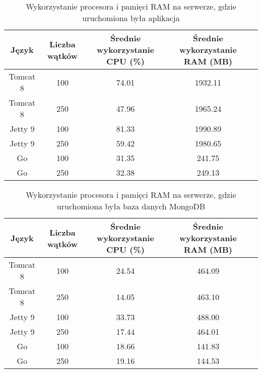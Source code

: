 
\begin{table}[!htb]
\centering
\caption{Wykorzystanie procesora i pamięci RAM na serwerze, gdzie uruchomiona była aplikacja}
\label{tab:app-full-api}
\begin{tabular}{@{}ccccl@{}}
\toprule
\textbf{Język} & \textbf{Liczba wątków} & \multicolumn{1}{p{3cm}}{\textbf{Średnie wykorzystanie CPU (\%)}} & \multicolumn{1}{p{3cm}}{\textbf{Średnie wykorzystanie RAM (MB)}} &  \\ \midrule
Tomcat 8       & 100                    & 74.01                             & 1932.11                          &  \\
Tomcat 8       & 250                    & 47.96                             & 1965.24                          &  \\
Jetty 9       & 100                    & 81.33                             & 1990.89                          &  \\
Jetty 9       & 250                    & 59.42                             & 1980.65                          &  \\
Go       & 100                    & 31.35                             & 241.75                          &  \\
Go       & 250                    & 32.38                             & 249.13                          &  \\
\bottomrule
\end{tabular}
\end{table}


\begin{table}[!htb]
\centering
\caption{Wykorzystanie procesora i pamięci RAM na serwerze, gdzie uruchomiona była baza danych MongoDB}
\label{tab:mongo-full-api}
\begin{tabular}{@{}ccccl@{}}
\toprule
\textbf{Język} & \textbf{Liczba wątków} & \multicolumn{1}{p{3cm}}{\textbf{Średnie wykorzystanie CPU (\%)}} & \multicolumn{1}{p{3cm}}{\textbf{Średnie wykorzystanie RAM (MB)}} &  \\ \midrule
Tomcat 8       & 100                    & 24.54                             & 464.09                          &  \\
Tomcat 8       & 250                    & 14.05                             & 463.10                         &  \\
Jetty 9       & 100                    & 33.73                             & 488.00                          &  \\
Jetty 9       & 250                    & 17.44                             & 464.01                          &  \\
Go       & 100                    & 18.66                             & 141.83                          &  \\
Go       & 250                    & 19.16                             & 144.53                          &  \\
\bottomrule
\end{tabular}
\end{table}

